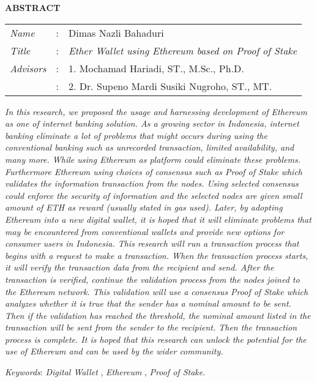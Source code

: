 \begin{center}
  \large\textbf{ABSTRACT}
\end{center}


\vspace{2ex}

\begingroup
  \setlength{\tabcolsep}{0pt}

  \noindent
  \begin{tabularx}{\textwidth}{l >{\centering}m{3em} X}
    \emph{Name}     &:& Dimas Nazli Bahaduri \\

    \emph{Title}    &:& \emph{Ether Wallet using Ethereum based on Proof of Stake} \\

    \emph{Advisors} &:& 1. Mochamad Hariadi, ST., M.Sc., Ph.D. \\
  &:& 2. Dr. Supeno Mardi Susiki Nugroho, ST., MT.
  \end{tabularx}
\endgroup

\emph{In this research, we proposed the usage and harnessing development of Ethereum as one of internet banking solution. As a growing sector in Indonesia, internet banking eliminate a lot of problems that might occurs during using the conventional banking such as unrecorded transaction, limited availability, and many more. While using Ethereum as platform could eliminate these problems. Furthermore Ethereum using choices of consensus such as Proof of Stake which validates the information transaction from the nodes. Using selected consensus could enforce the security of information and the selected nodes are given small amount of ETH as reward (usually stated in gas used). Later, by adopting Ethereum into a new digital wallet, it is hoped that it will eliminate problems that may be encountered from conventional wallets and provide new options for consumer users in Indonesia. This research will run a transaction process that begins with a request to make a transaction. When the transaction process starts, it will verify the transaction data from the recipient and send. After the transaction is verified, continue the validation process from the nodes joined to the Ethereum network. This validation will use a consensus Proof of Stake which analyzes whether it is true that the sender has a nominal amount to be sent. Then if the validation has reached the threshold, the nominal amount listed in the transaction will be sent from the sender to the recipient. Then the transaction process is complete. It is hoped that this research can unlock the potential for the use of Ethereum and can be used by the wider community. }

\emph{Keywords}: \emph{Digital Wallet} , \emph{Ethereum} , \emph{Proof of Stake}.
